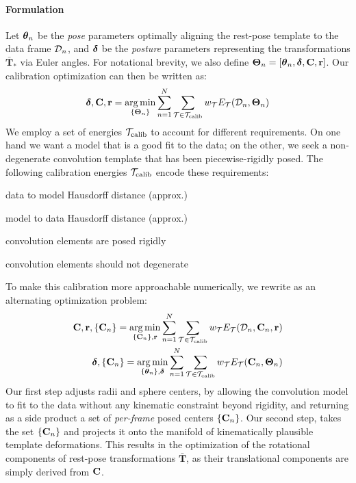 \paragraph{Formulation}
Let $\boldsymbol{\theta}_n$ be the \emph{pose} parameters optimally aligning the rest-pose template to the data frame $\mathcal{D}_n$, and $\boldsymbol{\delta}$ be the \emph{posture} parameters representing the transformations $\mathbf{\bar{T}}_*$ via Euler angles. For notational brevity, we also define $\boldsymbol{\Theta}_n=[\boldsymbol{\theta}_n, \boldsymbol{\delta}, {\mathbf{C}}, {\mathbf{r}}]$. Our calibration optimization can then be written as:
% 
\begin{eqnarray}
\boldsymbol{\delta}, {\mathbf{C}}, {\mathbf{r}} = \operatorname*{arg\,min}_{\{\boldsymbol{\Theta}_n\}}
\sum_{n=1}^N 
\sum_{\mathcal{T} \in {\mathcal{T}_\text{calib}}} 
w_\mathcal{T} E_\mathcal{T}(\mathcal{D}_n, \boldsymbol{\Theta}_n)
\label{eq:calibration}
\end{eqnarray}
% 
We employ a set of energies ${\mathcal{T}_\text{calib}}$ to account for different requirements. On one hand we want a model that is a good fit to the data; on the other, we seek a non-degenerate convolution template that has been piecewise-rigidly posed. The following calibration energies ${\mathcal{T}_\text{calib}}$ encode these requirements:
% 
\begin{description}[labelsep=0em,labelwidth=.4in,labelindent=1cm]
\item[d2m] data to model Hausdorff distance (approx.)
\item[m2d] model to data Hausdorff distance (approx.)
\item[rigid] convolution elements are posed rigidly
\item[valid] convolution elements should not degenerate
\end{description}
% 
To make this calibration more approachable numerically, we rewrite  as an alternating optimization problem:
% 
\begin{eqnarray}
{\mathbf{C}}, {\mathbf{r}}, {\{\mathbf{C}_n\}} =
\operatorname*{arg\,min}_{{\{\mathbf{C}_n\}}, {\mathbf{r}}} 
\sum_{n=1}^N 
\sum_{\mathcal{T} \in {\mathcal{T}_\text{calib}}}
w_\mathcal{T} E_\mathcal{T}(\mathcal{D}_n, {\mathbf{C}}_n, {\mathbf{r}})
\label{eq:step1}
\\
\boldsymbol{\delta}, {\{\mathbf{C}_n\}} =
\operatorname*{arg\,min}_{{\{\boldsymbol{\theta}_n\}},\boldsymbol{\delta}} 
\sum_{n=1}^N 
\sum_{\mathcal{T} \in {\mathcal{T}_\text{calib}}}
w_\mathcal{T} E_\mathcal{T}({\mathbf{C}}_n, \boldsymbol{\Theta}_n) 
\end{eqnarray}
% 
Our first step adjusts radii and sphere centers, by allowing the convolution model to fit to the data without any kinematic constraint beyond rigidity, and returning as a side product a set of \emph{per-frame} posed centers ${\{\mathbf{C}_n\}}$. Our second step, takes the set ${\{\mathbf{C}_n\}}$ and projects it onto the manifold of kinematically plausible template deformations. This results in the optimization of the rotational components of rest-pose transformations $\mathbf{\bar{T}}$, as their translational components are simply derived from ${\mathbf{C}}$.

